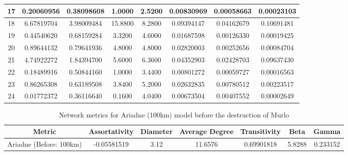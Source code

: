 \documentclass[12pt,a4paper]{thesis}
\begin{document}
\begin{table}[H]
\begin{tabular}{|c|c|c|c|c|c|c|c|}
\hline	17	&	0.20060956	&	0.38098608	&	1.0000	&	2.5200	&	0.00830969	&	0.00058663	&	0.00023103	\\
\hline	18	&	6.67819704	&	3.98009484	&	15.8800	&	8.2800	&	0.09394147	&	0.04162679	&	0.10691481	\\
\hline	19	&	0.44540620	&	0.68159284	&	3.3200	&	4.6000	&	0.01687598	&	0.00126330	&	0.00019425	\\
\hline	20	&	0.89644132	&	0.79641936	&	4.8000	&	4.8000	&	0.02820003	&	0.00252656	&	0.00084704	\\
\hline	21	&	4.74922272	&	1.84394700	&	5.6000	&	6.3600	&	0.04352903	&	0.02428703	&	0.09637430	\\
\hline	22	&	0.18489916	&	0.50844160	&	1.0000	&	3.4400	&	0.00801272	&	0.00059727	&	0.00016563	\\
\hline	23	&	0.86265308	&	0.63189508	&	3.8400	&	5.2000	&	0.02632835	&	0.00780512	&	0.00223517	\\
\hline	24	&	0.01772372	&	0.36116640	&	0.1600	&	4.0400	&	0.00673504	&	0.00407552	&	0.00002649	\\
\hline 
\end{tabular} 
\label{tab:ariadneNodeBefore60}
\end{table}



\begin{table}[H]
\centering
\caption{Network metrics for Ariadne (100km) model before the destruction of Murlo}
\tiny
\begin{tabular}{|c|c|c|c|c|c|c|}
\hline Metric & Assortativity & Diameter & Average Degree & Transitivity & Beta & Gamma \\ 
\hline Ariadne (Before: 100km) & -0.05581519 & 3.12 & 11.6576	& 0.69901818 & 5.8288 & 0.233152 \\
\hline 
\end{tabular} 
\label{tab:ariadneNetBefore100}
\end{table}
\end{document}
